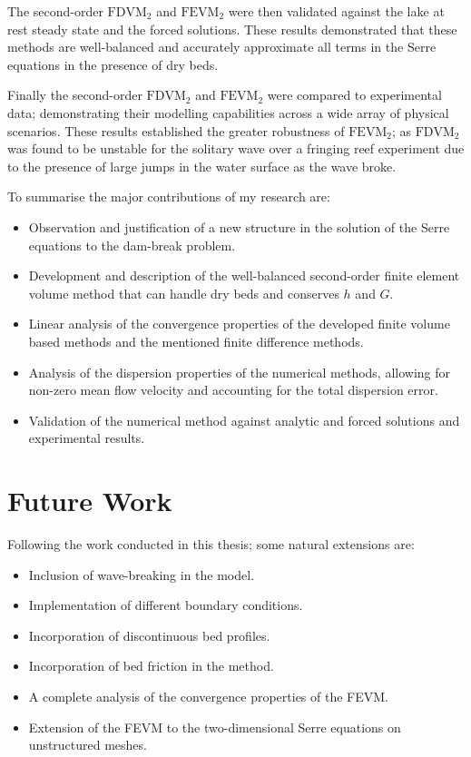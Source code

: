 The second-order $\text{FDVM}_2$ and $\text{FEVM}_2$ were then validated against the lake at rest steady state and the forced solutions. These results demonstrated that these methods are well-balanced and accurately approximate all terms in the Serre equations in the presence of dry beds. 

Finally the second-order $\text{FDVM}_2$ and $\text{FEVM}_2$ were compared to experimental data; demonstrating their modelling capabilities across a wide array of physical scenarios. These results established the greater robustness of $\text{FEVM}_2$; as $\text{FDVM}_2$ was found to be unstable for the solitary wave over a fringing reef experiment due to the presence of large jumps in the water surface as the wave broke. 

To summarise the major contributions of my research are:
\begin{itemize}
	\item Observation and justification of a new structure in the solution of the Serre equations to the dam-break problem.
	\item Development and description of the well-balanced second-order finite element volume method that can handle dry beds and conserves $h$ and $G$.
	\item Linear analysis of the convergence properties of the developed finite volume based methods and the mentioned finite difference methods.
	\item Analysis of the dispersion properties of the numerical methods, allowing for non-zero mean flow velocity and accounting for the total dispersion error.
	\item Validation of the numerical method against analytic and forced solutions and experimental results. 
\end{itemize}

\section{Future Work}
Following the work conducted in this thesis; some natural extensions are:
\begin{itemize}
	\item Inclusion of wave-breaking in the model. 
	\item Implementation of different boundary conditions.
	\item Incorporation of discontinuous bed profiles.
	\item Incorporation of bed friction in the method.
	\item A complete analysis of the convergence properties of the FEVM.
	\item Extension of the FEVM to the two-dimensional Serre equations on unstructured meshes.
\end{itemize}




